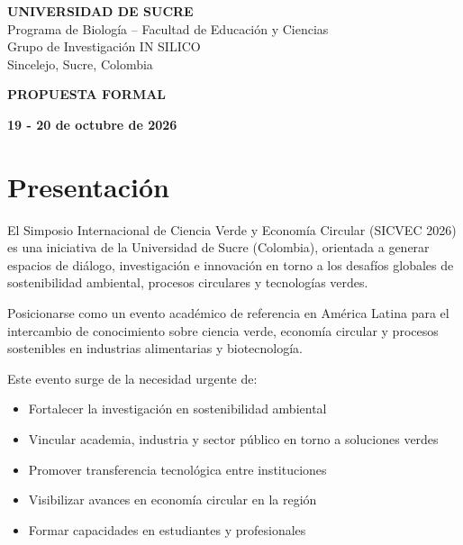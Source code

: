 \documentclass[12pt,a4paper]{article}
\begin{document}
\begin{center}
\vspace{0.2cm}

{\Large\bfseries\color{verdeosc} UNIVERSIDAD DE SUCRE}\\[0.2cm]
{\small Programa de Biología -- Facultad de Educación y Ciencias}\\[0.2cm]
{\small Grupo de Investigación IN SILICO}\\[0.2cm]
{\small Sincelejo, Sucre, Colombia}

\vspace{1.2cm}

{\large\bfseries\color{verdeosc} PROPUESTA FORMAL}

\vspace{0.5cm}

{\normalsize\bfseries\color{verdemid} 19 - 20 de octubre de 2026}

\end{center}

\newpage

\tableofcontents
\newpage

\section{Presentación}

El Simposio Internacional de Ciencia Verde y Economía Circular (SICVEC 2026) es una iniciativa de la Universidad de Sucre (Colombia), orientada a generar espacios de diálogo, investigación e innovación en torno a los desafíos globales de sostenibilidad ambiental, procesos circulares y tecnologías verdes.

\begin{tcolorbox}[cajainfo, title=Visión Estratégica]
Posicionarse como un evento académico de referencia en América Latina para el intercambio de conocimiento sobre ciencia verde, economía circular y procesos sostenibles en industrias alimentarias y biotecnología.
\end{tcolorbox}

Este evento surge de la necesidad urgente de:

\begin{itemize}[label={\textcolor{verdeosc}{\textbullet}}]
  \item Fortalecer la investigación en sostenibilidad ambiental
  \item Vincular academia, industria y sector público en torno a soluciones verdes
  \item Promover transferencia tecnológica entre instituciones
  \item Visibilizar avances en economía circular en la región
  \item Formar capacidades en estudiantes y profesionales
\end{itemize}
\end{document}
